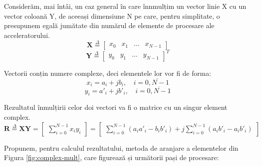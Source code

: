 Considerăm, mai întâi, un caz general în care înnmulțim un vector linie X cu un
vector coloană Y, de aceeași dimensiune N pe care, pentru simplitate, o presupunem
egală jumătate din numărul de elemente de procesare ale acceleratorului.
\begin{equation}
    \bm{X}
    \overset{\Delta}{=}
    \begin{bmatrix}
       x_0   &   x_1   &   \hdots   &   x_{N-1}
    \end{bmatrix}
\end{equation}
\begin{equation}
    \bm{Y}
    \overset{\Delta}{=}
    \begin{bmatrix}
       y_0   &   y_1   &   \hdots   &   y_{N-1}
    \end{bmatrix}^T
\end{equation}

Vectorii conțin numere complexe, deci elementele lor vor fi de forma:
\begin{equation}
x_i = a_i + jb_i, \quad i = \overline{0, N-1}
\end{equation}
\begin{equation}
y_{i} = a'_{i} + jb'_{i}, \quad i = \overline{0, N-1}
\end{equation}

Rezultatul înmulțirii celor doi vectori va fi o matrice cu un singur element
complex.
\begin{equation}
    \bm{R}
    \overset{\Delta}{=}
    \bm{X}\bm{Y}
    =
    \begin{bmatrix}
       \displaystyle{\sum_{i=0}^{N-1} x_iy_i}
    \end{bmatrix}
    = 
    \begin{bmatrix}
       \displaystyle{\sum_{i=0}^{N-1} (a_ia'_i - b_ib'_i) + j\sum_{i=0}^{N-1}
       (a_ib'_i - a_ib'_i)}
    \end{bmatrix}
\end{equation}

Propunem, pentru calculul rezultatului, metoda de aranjare a elementelor din
Figura \ref{fig:complex-mult}, care figurează și următorii pași de procesare:

